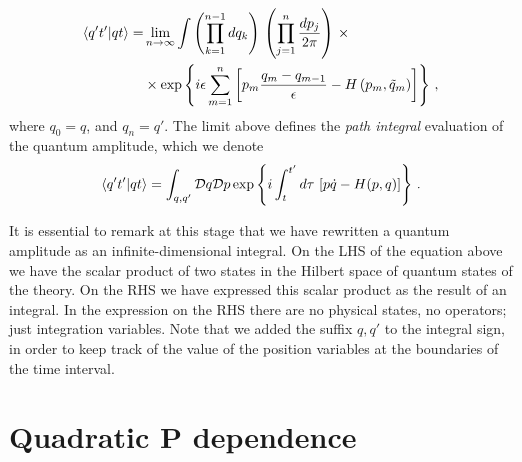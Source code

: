 \begin{align}
  \langle q't' | qt \rangle =& \lim_{n\to\infty} \int 
  \left(\prod_{k=1}^{n-1}dq_k\right)\, 
  \left(\prod_{j=1}^{n} \frac{dp_j}{2\pi}\right)\, \times \nonumber\\
  \label{eq:DiscretePhaseSpaceIntegral}
  &\times \exp \left\{
    i\epsilon \sum_{m=1}^{n} \left[
    p_m \frac{q_m-q_{m-1}}{\epsilon} - H\left(p_m, 
    \tilde{q}_m \right)
    \right]
    \right\}\, ,
\end{align}
where $q_0 = q$, and $q_n = q'$. The limit above defines the {\em
  path integral} evaluation of the quantum amplitude, which we denote 
\begin{align}
  \label{eq:PathIntDefZero}
  \langle q't' | qt \rangle = 
  \int_{q,q'} \mathcal{D}q \mathcal{D}p \exp \left\{
  i \int_t^{t'} d\tau\, \left[
  p \dot{q} - H(p,q)
  \right]
  \right\}\, .
\end{align}

It is essential to remark at this stage that we have rewritten
a quantum amplitude as an infinite-dimensional integral. On the LHS
of the equation above we have the scalar product of two states in 
the Hilbert space of quantum states of the theory. On the RHS we 
have expressed this scalar product as the result of an integral. 
In the expression on the RHS there are no physical states, no 
operators; just integration variables. Note that we added the suffix
$q,q'$ to the integral sign, in order to keep track of the value of 
the position variables at the boundaries of the time interval. 

\section{Quadratic P dependence}
\label{sec:quadr-kinet-term}

